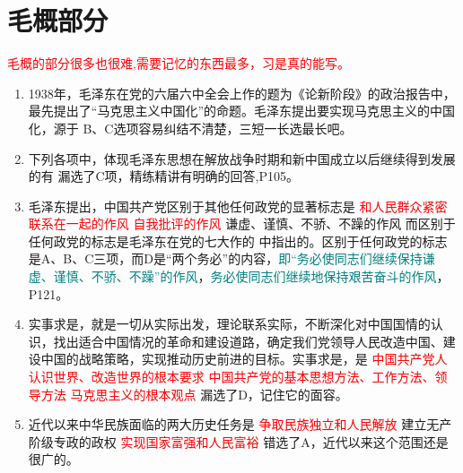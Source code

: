\section{毛概部分}
\textcolor{red}{\faBook 毛概的部分很多也很难,需要记忆的东西最多，习是真的能写。}
\begin{enumerate}[align=hang, start=1]
	\item 1938年，毛泽东在党的六届六中全会上作的题为《论新阶段》的政治报告中，最先提出了``马克思主义中国化''的命题。毛泽东提出要实现马克思主义的中国化，源于
	\note B、C选项容易纠结不清楚，三短一长选最长吧。
	
	\item 下列各项中，体现毛泽东思想在解放战争时期和新中国成立以后继续得到发展的有
	\xx{\textcolor{red}{提出了人民民主专政的理论}}{\textcolor{red}{提出了社会主义改造和建设社会主义制度的基本方略 }}{\textcolor{red}{ 提出了要把马克思主义的基本理论同中国革命和建设具体相结合的``第二次结合''}}{\textcolor{red}{ 提出了关于正确处理人民内部矛盾的理论}}
	\note 漏选了C项，精练精讲有明确的回答,P105。
	
	\item 毛泽东提出，中国共产党区别于其他任何政党的显著标志是 
	\xx {  \textcolor{red}{理论和实践相结合的作风}  } { 
		\textcolor{red}{和人民群众紧密联系在一起的作风} }    { \textcolor{red}{自我批评的作风} }   { 谦虚、谨慎、不骄、不躁的作风 }
	\note 而区别于任何政党的标志是毛泽东在党的七大作的 中指出的。区别于任何政党的标志是A、B、C三项，而D是``两个务必''的内容，\textcolor{teal}{即``务必使同志们继续保持谦虚、谨慎、不骄、不躁''的作风}，\textcolor{teal}{务必使同志们继续地保持艰苦奋斗的作风}，P121。
	
	\item 实事求是，就是一切从实际出发，理论联系实际，不断深化对中国国情的认识，找出适合中国情况的革命和建设道路，确定我们党领导人民改造中国、建设中国的战略策略，实现推动历史前进的目标。实事求是，是
	\xx {   	\textcolor{red}{ 马克思主义中国化理论成果的精髓和灵魂 }}    { 	\textcolor{red}{ 中国共产党人认识世界、改造世界的根本要求}  }    {	\textcolor{red}{ 中国共产党的基本思想方法、工作方法、领导方法 }   }  { 	\textcolor{red}{    马克思主义的根本观点}    }
	\note  漏选了D，记住它的面容。  
	
	\item 近代以来中华民族面临的两大历史任务是 
	 { 	\textcolor{red}{ 争取民族独立和人民解放 }}  {建立无产阶级专政的政权}  { 	\textcolor{red}{ 实现国家富强和人民富裕 }}
	\note 错选了A，近代以来这个范围还是很广的。
	

\end{enumerate}
